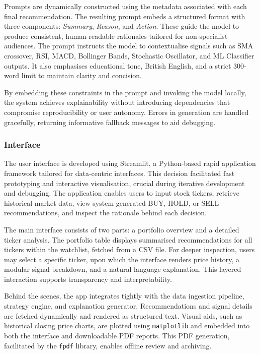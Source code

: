 Prompts are dynamically constructed using the metadata associated with each final recommendation. The resulting prompt embeds a structured format with three components: \textit{Summary}, \textit{Reason}, and \textit{Action}. These guide the model to produce consistent, human-readable rationales tailored for non-specialist audiences. The prompt instructs the model to contextualise signals such as SMA crossover, RSI, MACD, Bollinger Bands, Stochastic Oscillator, and ML Classifier outputs. It also emphasises educational tone, British English, and a strict 300-word limit to maintain clarity and concision.

By embedding these constraints in the prompt and invoking the model locally, the system achieves explainability without introducing dependencies that compromise reproducibility or user autonomy. Errors in generation are handled gracefully, returning informative fallback messages to aid debugging.

\subsubsection{Interface}

The user interface is developed using Streamlit, a Python-based rapid application framework tailored for data-centric interfaces. This decision facilitated fast prototyping and interactive visualisation, crucial during iterative development and debugging. The application enables users to input stock tickers, retrieve historical market data, view system-generated BUY, HOLD, or SELL recommendations, and inspect the rationale behind each decision.

The main interface consists of two parts: a portfolio overview and a detailed ticker analysis. The portfolio table displays summarised recommendations for all tickers within the watchlist, fetched from a CSV file. For deeper inspection, users may select a specific ticker, upon which the interface renders price history, a modular signal breakdown, and a natural language explanation. This layered interaction supports transparency and interpretability.

Behind the scenes, the app integrates tightly with the data ingestion pipeline, strategy engine, and explanation generator. Recommendations and signal details are fetched dynamically and rendered as structured text. Visual aids, such as historical closing price charts, are plotted using \texttt{matplotlib} and embedded into both the interface and downloadable PDF reports. This PDF generation, facilitated by the \texttt{fpdf} library, enables offline review and archiving.

